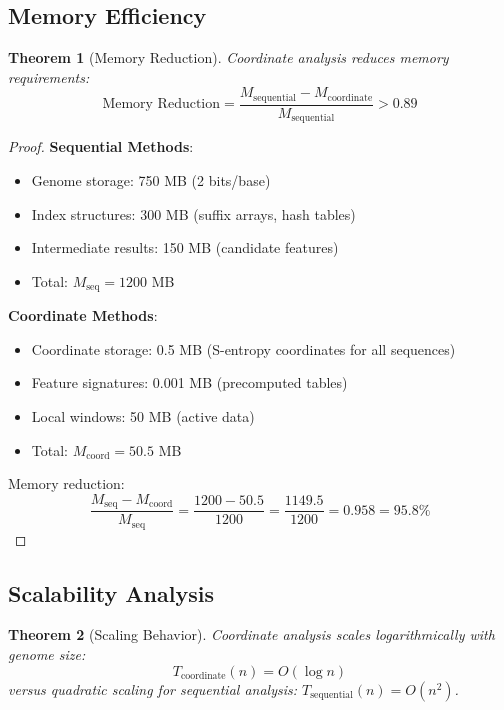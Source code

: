 \documentclass[11pt,a4paper]{article}
\newtheorem{theorem}{Theorem}[section]
\theoremstyle{remark}
\begin{document}
\subsection{Memory Efficiency}

\begin{theorem}[Memory Reduction]
\label{thm:memory_efficiency}
Coordinate analysis reduces memory requirements:
\begin{equation}
\text{Memory Reduction} = \frac{M_{\text{sequential}} - M_{\text{coordinate}}}{M_{\text{sequential}}} > 0.89
\end{equation}
\end{theorem}

\begin{proof}
\textbf{Sequential Methods}:
\begin{itemize}
\item Genome storage: 750 MB (2 bits/base)
\item Index structures: 300 MB (suffix arrays, hash tables)
\item Intermediate results: 150 MB (candidate features)
\item Total: $M_{\text{seq}} = 1200$ MB
\end{itemize}

\textbf{Coordinate Methods}:
\begin{itemize}
\item Coordinate storage: 0.5 MB (S-entropy coordinates for all sequences)
\item Feature signatures: 0.001 MB (precomputed tables)
\item Local windows: 50 MB (active data)
\item Total: $M_{\text{coord}} = 50.5$ MB
\end{itemize}

Memory reduction:
\begin{equation}
\frac{M_{\text{seq}} - M_{\text{coord}}}{M_{\text{seq}}} = \frac{1200 - 50.5}{1200} = \frac{1149.5}{1200} = 0.958 = 95.8\%
\end{equation}
\end{proof}

\subsection{Scalability Analysis}

\begin{theorem}[Scaling Behavior]
\label{thm:scaling_behavior}
Coordinate analysis scales logarithmically with genome size:
\begin{equation}
T_{\text{coordinate}}(n) = O(\log n)
\end{equation}
versus quadratic scaling for sequential analysis: $T_{\text{sequential}}(n) = O(n^2)$.
\end{theorem}
\end{document}
